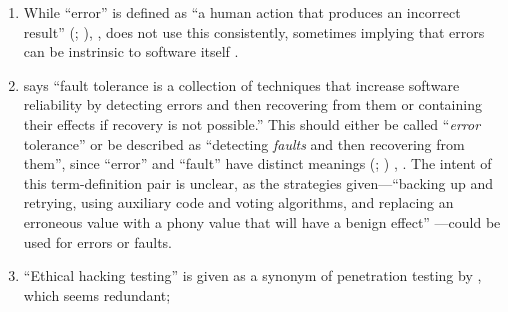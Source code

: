 \begin{enumerate}
    \item %
          While ``error'' is defined as ``a human action that produces an incorrect
          result'' \ifnotpaper (\citealp[pp.~12\=/3]{SWEBOK2024};
              \citealp[p.~399]{vanVliet2000})\else \cite[pp.~12\=/3]{SWEBOK2024},
              \cite[p.~399]{vanVliet2000}\fi, \citeauthor{SWEBOK2024} does not
          use this consistently, sometimes implying that errors can be instrinsic
          to software itself \citeyearpar[pp.~4\=/9, 6\=/5, 7\=/3, 12\=/4,
              12\=/9, 12\=/13]{SWEBOK2024}.
    \item %
           \citet[p.~4\=/11]{SWEBOK2024} says ``fault tolerance is
          a collection of techniques that increase software reliability by
          detecting errors and then recovering from them or containing their
          effects if recovery is not possible.'' This should either be called
          ``\emph{error} tolerance'' or be described as ``detecting
          \emph{faults} and then recovering from them'', since ``error'' and
          ``fault'' have distinct meanings \ifnotpaper
              (\citealp[p.~5\=/3]{SWEBOK2024};
              \citealp[pp.~399--400]{vanVliet2000})\else
              \cite[p.~5\=/3]{SWEBOK2024},
              \cite[pp.~399--400]{vanVliet2000}\fi. The intent of this
          term-definition pair is unclear, as the strategies given---``backing
          up and retrying, using auxiliary code and voting algorithms, and
          replacing an erroneous value with a phony value that will have a
          benign effect'' \citep[p.~4\=/11]{SWEBOK2024}---could be used for
          errors or faults.
    \item %
          ``Ethical hacking testing'' is given as a synonym of penetration
          testing by \citet[p.~13-4]{SWEBOK2024}, which seems redundant;

\end{enumerate}
